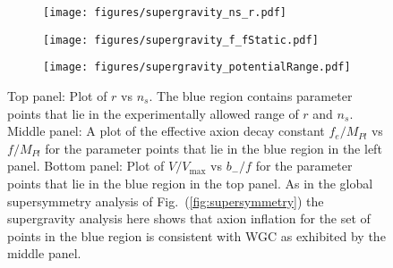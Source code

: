 \documentclass[12pt]{article}
\begin{document}
\begin{figure}
  \centering
  \begin{subfigure}{0.5 \textwidth}
    \texttt{[image: figures/supergravity\_ns\_r.pdf]}
  \end{subfigure}
  \begin{subfigure}{0.5 \textwidth}
    \texttt{[image: figures/supergravity\_f\_fStatic.pdf]}
  \end{subfigure}
  \begin{subfigure}{0.55 \textwidth}
    \texttt{[image: figures/supergravity\_potentialRange.pdf]}
  \end{subfigure}
  \caption{\protect
    Top panel: Plot of $r$ vs $n_s$.
    The blue region contains parameter points that lie in the experimentally allowed range of $r$ and $n_s$.
    Middle panel: A plot of the effective axion decay constant $f_e / M_{Pl}$ vs $f / M_{Pl}$ for the parameter points that lie in the blue region in the left panel.
    Bottom panel: Plot of $V / V_\text{max}$ vs $b_- / f$ for the parameter points that lie in the blue region in the top panel.
    As in the global supersymmetry analysis of Fig.~(\ref{fig:supersymmetry}) the supergravity analysis here shows that axion inflation for the set of points in the blue region is consistent with WGC as exhibited by the middle panel.
  } \label{fig:supergravity}
\end{figure}
\end{document}
